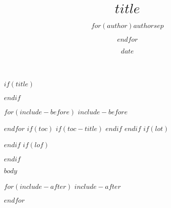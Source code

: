 \documentclass[12pt,a4paper]{article}
\title{$title$}
\author{$for(author)$$author$$sep$ \and $endfor$}
\date{$date$}
\begin{document}
$if(title)$
\maketitle
$endif$

$for(include-before)$
$include-before$

$endfor$
$if(toc)$
$if(toc-title)$
\renewcommand*\contentsname{$toc-title$}
$endif$
\tableofcontents
$endif$
$if(lot)$
\listoftables
$endif$
$if(lof)$
\listoffigures
$endif$

$body$

$for(include-after)$
$include-after$

$endfor$
\end{document}
